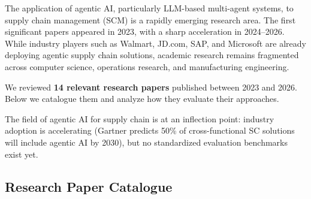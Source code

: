 \documentclass[11pt,a4paper]{article}
\begin{document}
The application of agentic AI, particularly LLM-based multi-agent systems, to supply chain management (SCM) is a rapidly emerging research area. The first significant papers appeared in 2023, with a sharp acceleration in 2024--2026. While industry players such as Walmart, JD.com, SAP, and Microsoft are already deploying agentic supply chain solutions, academic research remains fragmented across computer science, operations research, and manufacturing engineering.

We reviewed \textbf{14 relevant research papers} published between 2023 and 2026. Below we catalogue them and analyze how they evaluate their approaches.

\begin{keyinsight}
The field of agentic AI for supply chain is at an inflection point: industry adoption is accelerating (Gartner predicts 50\% of cross-functional SC solutions will include agentic AI by 2030), but no standardized evaluation benchmarks exist yet.
\end{keyinsight}

\vspace{0.8em}

\subsection{Research Paper Catalogue}

\renewcommand{\arraystretch}{1.35}
\end{document}
